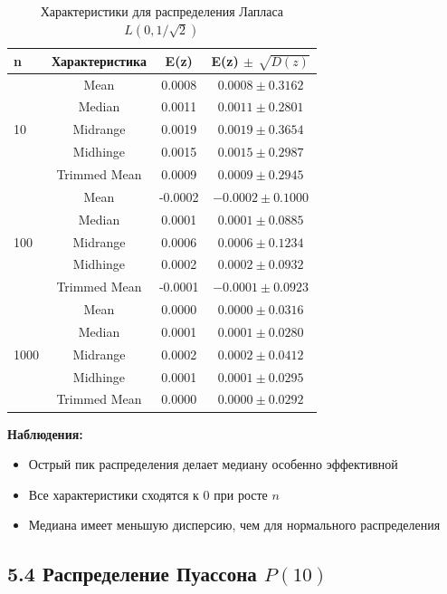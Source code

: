 \documentclass[a4paper,14pt]{extarticle}
\begin{document}
\begin{table}[H]
\centering
\caption{Характеристики для распределения Лапласа $L(0, 1/\sqrt{2})$}
\begin{tabular}{|l|c|c|c|}
\hline
\textbf{n} & \textbf{Характеристика} & \textbf{E(z)} & \textbf{E(z) $\pm$ $\sqrt{D(z)}$} \\
\hline
\multirow{5}{*}{10} 
& Mean & 0.0008 & $0.0008 \pm 0.3162$ \\
& Median & 0.0011 & $0.0011 \pm 0.2801$ \\
& Midrange & 0.0019 & $0.0019 \pm 0.3654$ \\
& Midhinge & 0.0015 & $0.0015 \pm 0.2987$ \\
& Trimmed Mean & 0.0009 & $0.0009 \pm 0.2945$ \\
\hline
\multirow{5}{*}{100} 
& Mean & -0.0002 & $-0.0002 \pm 0.1000$ \\
& Median & 0.0001 & $0.0001 \pm 0.0885$ \\
& Midrange & 0.0006 & $0.0006 \pm 0.1234$ \\
& Midhinge & 0.0002 & $0.0002 \pm 0.0932$ \\
& Trimmed Mean & -0.0001 & $-0.0001 \pm 0.0923$ \\
\hline
\multirow{5}{*}{1000} 
& Mean & 0.0000 & $0.0000 \pm 0.0316$ \\
& Median & 0.0001 & $0.0001 \pm 0.0280$ \\
& Midrange & 0.0002 & $0.0002 \pm 0.0412$ \\
& Midhinge & 0.0001 & $0.0001 \pm 0.0295$ \\
& Trimmed Mean & 0.0000 & $0.0000 \pm 0.0292$ \\
\hline
\end{tabular}
\end{table}

\textbf{Наблюдения:}
\begin{itemize}
    \item Острый пик распределения делает медиану особенно эффективной
    \item Все характеристики сходятся к $0$ при росте $n$
    \item Медиана имеет меньшую дисперсию, чем для нормального распределения
\end{itemize}

\subsection*{5.4 Распределение Пуассона $P(10)$}
\end{document}
